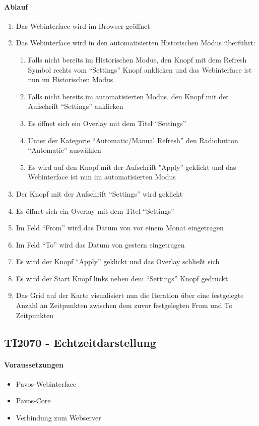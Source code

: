 \paragraph{Ablauf}
\begin{enumerate}
\item Das Webinterface wird im Browser geöffnet
\item Das Webinterface wird in den automatisierten Historischen Modus überführt:
\begin{enumerate}
\item Falls nicht bereits im Historischen Modus, den Knopf mit dem Refresh Symbol rechts vom ``Settings'' Knopf anklicken und das Webinterface ist nun im Historischen Modus
\item Falls nicht bereits im automatisierten Modus, den Knopf mit der Aufschrift ``Settings'' anklicken
\item Es öffnet sich ein Overlay mit dem Titel ``Settings''
\item Unter der Kategorie ``Automatic/Manual Refresh'' den Radiobutton ``Automatic'' auswählen
\item Es wird auf den Knopf mit der Aufschrift "Apply'' geklickt und das Webinterface ist nun im automatisierten Modus
\end{enumerate}
\item Der Knopf mit der Aufschrift ``Settings'' wird geklickt
\item Es öffnet sich ein Overlay mit dem Titel ``Settings''
\item Im Feld ``From'' wird das Datum von vor einem Monat eingetragen
\item Im Feld ``To'' wird das Datum von gestern eingetragen
\item Es wird der Knopf ``Apply'' geklickt und das Overlay schließt sich
\item Es wird der Start Knopf links neben dem ``Settings'' Knopf gedrückt
\item Das Grid auf der Karte visualisiert nun die Iteration über eine festgelegte Anzahl an Zeitpunkten zwischen dem zuvor festgelegten From und To Zeitpunkten
\end{enumerate}
\szenarioGood

\subsection{TI2070 - Echtzeitdarstellung}
\paragraph{Voraussetzungen}
\begin{itemize}
\item Pavos-Webinterface
\item Pavos-Core
\item Verbindung zum Webserver
\end{itemize}

